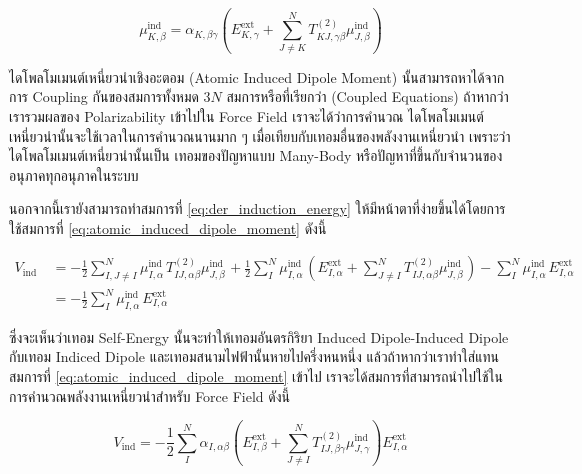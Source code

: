 \begin{equation}
  \label{eq:atomic_induced_dipole_moment}
  \mu_{K, \beta}^{\text {ind }}
  =
  \alpha_{K, \beta \gamma}
  \left(
  E_{K, \gamma}^{\mathrm{ext}}
  + \sum_{J \neq K}^N T_{K J, \gamma \beta}^{(2)} \mu_{J, \beta}^{\mathrm{ind}}
  \right)
\end{equation}

ไดโพลโมเมนต์เหนี่ยวนำเชิงอะตอม (Atomic Induced Dipole Moment) นั้นสามารถหาได้จากการ Coupling กันของสมการทั้งหมด $3 N$
สมการหรือที่เรียกว่า (Coupled Equations) ถ้าหากว่าเรารวมผลของ Polarizability เข้าไปใน Force Field เราจะได้ว่าการคำนวณ%
ไดโพลโมเมนต์เหนี่ยวนำนั้นจะใช้เวลาในการคำนวณนานมาก ๆ เมื่อเทียบกับเทอมอื่นของพลังงานเหนี่ยวนำ เพราะว่าไดโพลโมเมนต์เหนี่ยวนำนั้นเป็น%
เทอมของปัญหาแบบ Many-Body หรือปัญหาที่ขึ้นกับจำนวนของอนุภาคทุกอนุภาคในระบบ

นอกจากนี้เรายังสามารถทำสมการที่ \eqref{eq:der_induction_energy} ให้มีหน้าตาที่ง่ายขึ้นได้โดยการใช้สมการที่
\eqref{eq:atomic_induced_dipole_moment} ดังนี้

\begin{equation}
  \begin{aligned}
    V_{\text {ind }}
     & = -\frac{1}{2} \sum_{I, J \neq I}^N
    \mu_{I, \alpha}^{\text {ind }} T_{I J, \alpha \beta}^{(2)} \mu_{J, \beta}^{\text {ind }}
    +\frac{1}{2} \sum_I^N \mu_{I, \alpha}^{\text {ind }}
    \left(
    E_{I, \alpha}^{\mathrm{ext}}
    +\sum_{J \neq I}^N T_{I J, \alpha \beta}^{(2)} \mu_{J, \beta}^{\text {ind }}
    \right)
    -\sum_I^N \mu_{I, \alpha}^{\text {ind }} E_{I, \alpha}^{\text {ext }}                  \\
     & = -\frac{1}{2} \sum_I^N \mu_{I, \alpha}^{\text {ind }} E_{I, \alpha}^{\text {ext }}
  \end{aligned}
\end{equation}

\noindent ซึ่งจะเห็นว่าเทอม Self-Energy นั้นจะทำให้เทอมอันตรกิริยา Induced Dipole-Induced Dipole กับเทอม Indiced Dipole
และเทอมสนามไฟฟ้านั้นหายไปครึ่งหนหนึ่ง แล้วถ้าหากว่าเราทำใส่แทนสมการที่ \eqref{eq:atomic_induced_dipole_moment} เข้าไป 
เราจะได้สมการที่สามารถนำไปใช้ในการคำนวณพลังงานเหนี่ยวนำสำหรับ Force Field ดังนี้

\begin{equation}
  V_{\mathrm{ind}}
  =
  -\frac{1}{2} \sum_I^N \alpha_{I, \alpha \beta}
  \left(
  E_{I, \beta}^{\mathrm{ext}}
  + \sum_{J \neq I}^N T_{I J, \beta \gamma}^{(2)} \mu_{J, \gamma}^{\mathrm{ind}}
  \right)
  E_{I, \alpha}^{\mathrm{ext}}
\end{equation}

